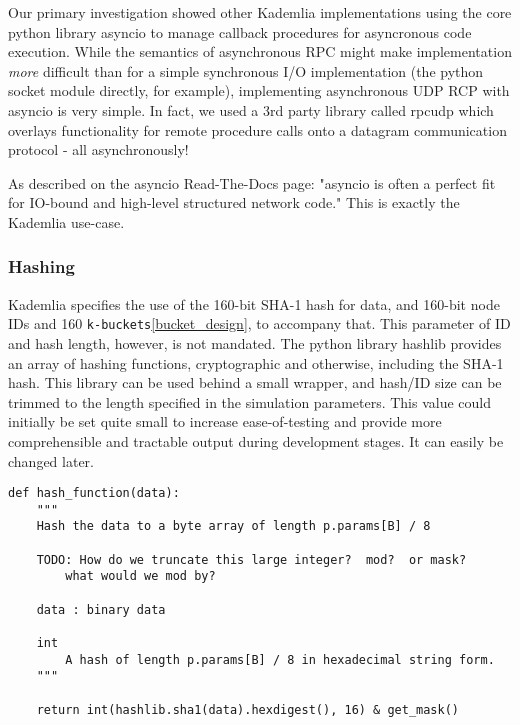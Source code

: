 \documentclass[12pt]{report}
\newcommand{\code}[1]{\colorbox{codegray}{\texttt{#1}}}
\begin{document}
                Our primary investigation showed other Kademlia
                implementations using the core python library asyncio to manage
                callback procedures for asyncronous code execution. While the
                semantics of asynchronous RPC might make implementation
                \textit{more} difficult than for a simple synchronous I/O
                implementation (the python socket module directly, for
                example), implementing asynchronous UDP RCP with asyncio is
                very simple.  In fact, we used a 3rd party library called
                rpcudp which overlays functionality for remote procedure calls
                onto a datagram communication protocol - all
                asynchronously!\cite{rpcudp}

                As described on the asyncio Read-The-Docs page: "asyncio is
                often a perfect fit for IO-bound and high-level structured
                network code." This is exactly the Kademlia
                use-case.\cite{asyncio}

            \subsubsection{Hashing}\label{hashing_design}
                Kademlia specifies the use of the 160-bit SHA-1 hash for data,
                and 160-bit node IDs and 160
                \code{k-buckets}\ref{bucket_design}, to accompany that.
                This parameter of ID and hash length, however, is not mandated.
                The python library hashlib provides an array of hashing
                functions, cryptographic and otherwise, including the SHA-1
                hash.  This library can be used behind a small wrapper, and
                hash/ID size can be trimmed to the length specified in the
                simulation parameters.  This value could initially be set quite
                small to increase ease-of-testing and provide more
                comprehensible and tractable output during development stages.
                It can easily be changed later.
\begin{lstlisting}[label=hash_function]
def hash_function(data):
    """
    Hash the data to a byte array of length p.params[B] / 8

    TODO: How do we truncate this large integer?  mod?  or mask?
        what would we mod by?

    data : binary data
    
    int 
        A hash of length p.params[B] / 8 in hexadecimal string form.
    """
        
    return int(hashlib.sha1(data).hexdigest(), 16) & get_mask() 
\end{lstlisting}
            
\end{document}
